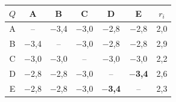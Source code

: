 \begin{tabular}{@{}c|ccccc|c@{}}
$Q$ & A & B & C & D & E & $r_i$\\\midrule
A & -- & $-$3{,}4 & $-$3{,}0 & $-$2{,}8 & $-$2{,}8 & 2{,}0\\
B & $-$3{,}4 & -- & $-$3{,}0 & $-$2{,}8 & $-$2{,}8 & 2{,}9\\
C & $-$3{,}0 & $-$3{,}0 & -- & $-$3{,}0 & $-$3{,}0 & 2{,}2\\
D & $-$2{,}8 & $-$2{,}8 & $-$3{,}0 & -- & \cellcolor{amarillo!40}\textbf{$-$3{,}4} & 2{,}6\\
E & $-$2{,}8 & $-$2{,}8 & $-$3{,}0 & \cellcolor{amarillo!40}\textbf{$-$3{,}4} & -- & 2{,}3\\
\end{tabular}
